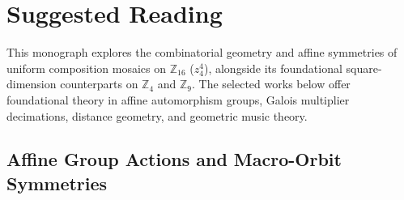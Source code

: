 \chapter*{Suggested Reading}

This monograph explores the combinatorial geometry and affine symmetries of uniform composition mosaics on $\mathbb{Z}_{16}$ ($z_4^4$), alongside its foundational square-dimension counterparts on $\mathbb{Z}_4$ and $\mathbb{Z}_9$. The selected works below offer foundational theory in affine automorphism groups, Galois multiplier decimations, distance geometry, and geometric music theory.

\section*{Affine Group Actions and Macro-Orbit Symmetries}

